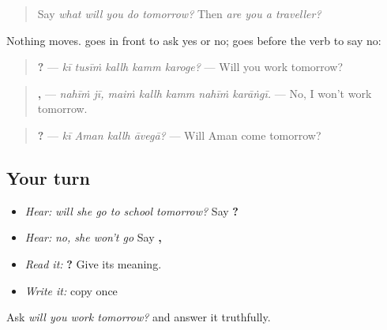 \label{lesson:PA-C222-ki-nahin-future}



\begin{quote}
Say \emph{what will you do tomorrow?} Then \emph{are you a traveller?}
\end{quote}

\begin{grammarlens}[title={Grammar Lens: \pa{ਕੀ} and \pa{ਨਹੀਂ} with the future}]
Nothing moves. \textbf{} goes in front to ask yes or no; \textbf{} goes before the verb to say no:

\begin{quote}
\textbf{    ?} — \emph{kī tusīṁ kallh kamm karoge?} — Will you work tomorrow?
\end{quote}

\begin{quote}
\textbf{ ,     } — \emph{nahīṁ jī, maiṁ kallh kamm nahīṁ karāṅgī.} — No, I won't work tomorrow.
\end{quote}

\begin{quote}
\textbf{   ?} — \emph{kī Aman kallh āvegā?} — Will Aman come tomorrow?
\end{quote}
\end{grammarlens}

\subsection*{Your turn}
\begin{itemize}
\raggedright
  \item \emph{Hear:} \emph{will she go to school tomorrow?} Say \textbf{    ?}
  \item \emph{Hear:} \emph{no, she won't go} Say \textbf{ ,   }
  \item \emph{Read it:} \textbf{   ?} Give its meaning.
  \item \emph{Write it:} copy \textbf{ } once
\end{itemize}

\begin{tcolorbox}[breakable,colback=teal!4,colframe=teal!35!black,title={Before you move on}]
Ask \emph{will you work tomorrow?} and answer it truthfully.
\end{tcolorbox}
